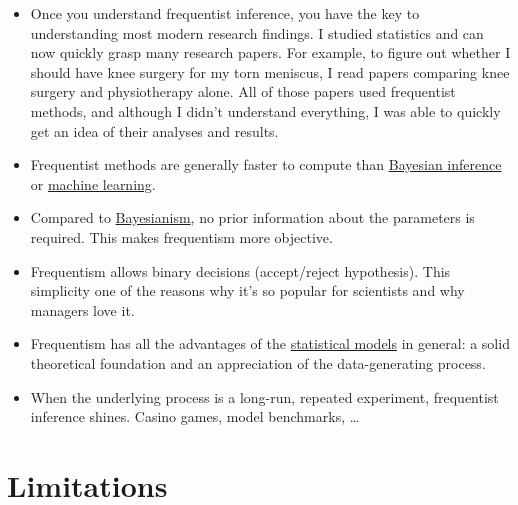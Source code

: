 \documentclass[
  10pt,
]{scrbook}
\providecommand{\tightlist}{%
  \setlength{\itemsep}{0pt}\setlength{\parskip}{0pt}}
\begin{document}
\begin{itemize}
\tightlist
\item
  Once you understand frequentist inference, you have the key to understanding most modern research findings. I studied statistics and can now quickly grasp many research papers. For example, to figure out whether I should have knee surgery for my torn meniscus, I read papers comparing knee surgery and physiotherapy alone. All of those papers used frequentist methods, and although I didn't understand everything, I was able to quickly get an idea of their analyses and results.
\item
  Frequentist methods are generally faster to compute than \protect\hyperlink{bayesian}{Bayesian inference} or \protect\hyperlink{supervised-ml}{machine learning}.
\item
  Compared to \protect\hyperlink{bayesian}{Bayesianism}, no prior information about the parameters is required. This makes frequentism more objective.
\item
  Frequentism allows binary decisions (accept/reject hypothesis). This simplicity one of the reasons why it's so popular for scientists and why managers love it.
\item
  Frequentism has all the advantages of the \protect\hyperlink{statistical-modeling}{statistical models} in general: a solid theoretical foundation and an appreciation of the data-generating process.
\item
  When the underlying process is a long-run, repeated experiment, frequentist inference shines. Casino games, model benchmarks, \ldots{}
\end{itemize}

\hypertarget{limitations-1}{%
\section{Limitations}\label{limitations-1}}
\end{document}
